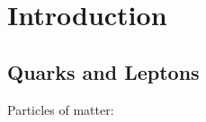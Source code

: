 \documentclass{include/thesisclass}
\begin{document}
    \FrontMatter

    
    
    \begingroup \let\clearpage\relax    %
    \tableofcontents                    %
    \endgroup



    \MainMatter
\chapter{Introduction}
\section{Quarks and Leptons}
Particles of matter:\\
\end{document}
